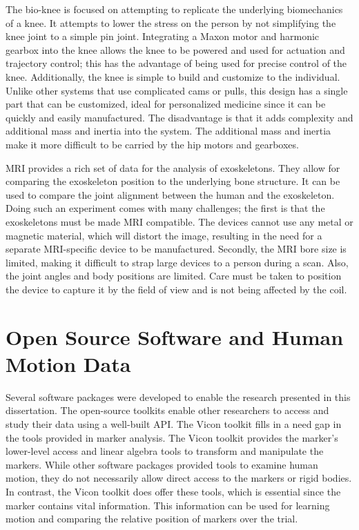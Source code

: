 The bio-knee is focused on attempting to replicate the underlying biomechanics of a knee. It attempts to lower the stress on the person by not simplifying the knee joint to a simple pin joint. Integrating a Maxon motor and harmonic gearbox into the knee allows the knee to be powered and used for actuation and trajectory control; this has the advantage of being used for precise control of the knee. Additionally, the knee is simple to build and customize to the individual. Unlike other systems that use complicated cams or pulls, this design has a single part that can be customized, ideal for personalized medicine since it can be quickly and easily manufactured. The disadvantage is that it adds complexity and additional mass and inertia into the system. The additional mass and inertia make it more difficult to be carried by the hip motors and gearboxes.

MRI provides a rich set of data for the analysis of exoskeletons. They allow for comparing the exoskeleton position to the underlying bone structure. It can be used to compare the joint alignment between the human and the exoskeleton. Doing such an experiment comes with many challenges; the first is that the exoskeletons must be made MRI compatible. The devices cannot use any metal or magnetic material, which will distort the image, resulting in the need for a separate MRI-specific device to be manufactured. Secondly, the MRI bore size is limited, making it difficult to strap large devices to a person during a scan. Also, the joint angles and body positions are limited. Care must be taken to position the device to capture it by the field of view and is not being affected by the coil. 


\section{Open Source Software and Human Motion Data}

Several software packages were developed to enable the research presented in this dissertation. The open-source toolkits enable other researchers to access and study their data using a well-built API. The Vicon toolkit fills in a need gap in the tools provided in marker analysis. The Vicon toolkit provides the marker's lower-level access and linear algebra tools to transform and manipulate the markers. While other software packages provided tools to examine human motion, they do not necessarily allow direct access to the markers or rigid bodies. In contrast, the Vicon toolkit does offer these tools, which is essential since the marker contains vital information. This information can be used for learning motion and comparing the relative position of markers over the trial. 

